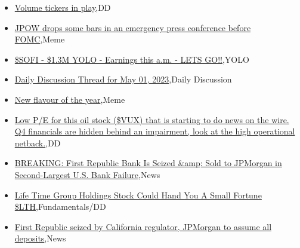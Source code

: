 \documentclass{article}%
\begin{document}
%
\begin{itemize}%
\item%
\href{https://reddit.com/r/wallstreetbets/comments/134l03a/volume\_tickers\_in\_play/}{Volume tickers in play},DD%
\item%
\href{https://reddit.com/r/wallstreetbets/comments/134jjp0/jpow\_drops\_some\_bars\_in\_an\_emergency\_press/}{JPOW drops some bars in an emergency press conference before FOMC},Meme%
\item%
\href{https://reddit.com/r/wallstreetbets/comments/134j107/sofi\_13m\_yolo\_earnings\_this\_am\_lets\_go/}{\$SOFI - \$1.3M YOLO - Earnings this a.m. - LETS GO!!},YOLO%
\item%
\href{https://reddit.com/r/wallstreetbets/comments/134i6tw/daily\_discussion\_thread\_for\_may\_01\_2023/}{Daily Discussion Thread for May 01, 2023},Daily Discussion%
\item%
\href{https://reddit.com/r/wallstreetbets/comments/134hfo0/new\_flavour\_of\_the\_year/}{New flavour of the year},Meme%
\item%
\href{https://reddit.com/r/Baystreetbets/comments/133sl1x/low\_pe\_for\_this\_oil\_stock\_vux\_that\_is\_starting\_to/}{Low P/E for this oil stock (\$VUX) that is starting to do news on the wire. Q4 financials are hidden behind an impairment, look at the high operational netback.},DD%
\item%
\href{https://reddit.com/r/StockMarket/comments/134hxlm/breaking\_first\_republic\_bank\_is\_seized\_sold\_to/}{BREAKING: First Republic Bank Is Seized \&amp; Sold to JPMorgan in Second-Largest U.S. Bank Failure},News%
\item%
\href{https://reddit.com/r/StockMarket/comments/134gj2l/life\_time\_group\_holdings\_stock\_could\_hand\_you\_a/}{Life Time Group Holdings Stock Could Hand You A Small Fortune \$LTH},Fundamentals/DD%
\item%
\href{https://reddit.com/r/Economics/comments/134g2sh/first\_republic\_seized\_by\_california\_regulator/}{First Republic seized by California regulator, JPMorgan to assume all deposits},News%
\end{itemize}%
\end{document}
